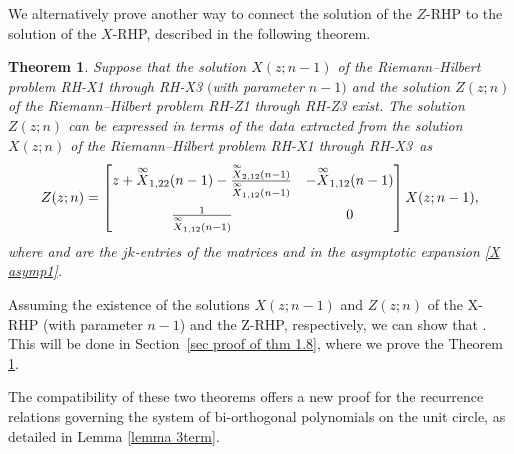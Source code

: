 \documentclass[pdftex]{sigma}
\numberwithin{equation}{section}
\newtheorem{Theorem}{Theorem}[section]
\begin{document}
	We alternatively prove another way to connect the solution of the $Z$-RHP to the solution of the $X$-RHP, described in the following theorem.
	\begin{Theorem}\label{thmXZ intro} Suppose that the solution $X(z;n-1)$ of the Riemann--Hilbert problem \mbox{{\rm RH-X1}} through {\rm RH-X3} $($with parameter $n-1)$ and the solution $Z(z;n)$ of the Riemann--Hilbert problem {\rm RH-Z1} through {\rm RH-Z3} exist. The solution $Z(z;n)$ can be expressed in terms of the data extracted from the solution $X(z;n)$ of the Riemann--Hilbert problem {\rm RH-X1} through {\rm RH-X3}~as%
		\begin{equation}\label{Z in terms of X1}
			Z(z;n) = \begin{bmatrix}
				z + \overset{\infty}{X}_{1,22}(n-1) - \tfrac{\overset{\infty}{X}_{2,12}(n-1)}{\overset{\infty}{X}_{1,12}(n-1)} & -\overset{\infty}{X}_{1,12}(n-1) \vspace{6pt}\\
				\tfrac{1}{\overset{\infty}{X}_{1,12}(n-1)} & 0
			\end{bmatrix} X(z;n-1),
		\end{equation} where  and  are the $jk$-entries of the matrices  and  in the asymptotic expansion \eqref{X asymp1}.
	\end{Theorem}
	
\begin{Remark}
		Assuming the existence of the solutions $X(z;n-1)$ and $Z(z;n)$ of the X-RHP (with parameter $n-1$) and the Z-RHP, respectively, we can show that . This will be done in
		Section~\ref{sec proof of thm 1.8}, where we prove the Theorem \ref{thmXZ intro}.
	\end{Remark}
	
	\begin{Remark}
		The compatibility of these two theorems offers a new proof for the recurrence relations governing the system of bi-orthogonal polynomials on the unit circle, as detailed in Lemma \ref{lemma 3term}.	
	\end{Remark}
	
\end{document}
